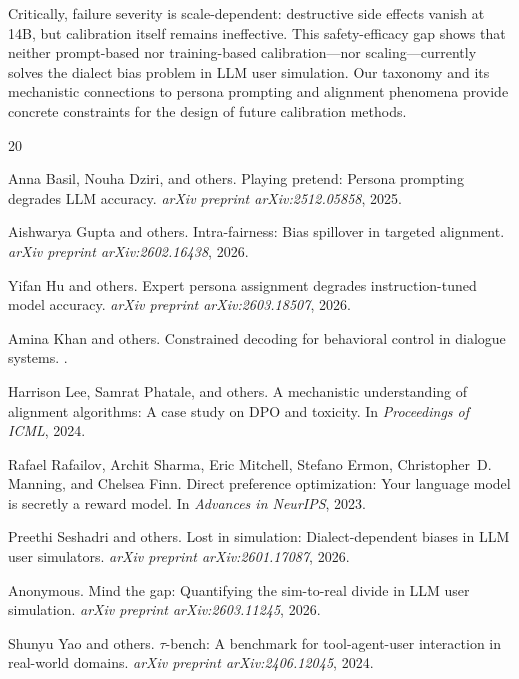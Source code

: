 \documentclass[11pt,a4paper]{article}
\begin{document}
Critically, failure severity is scale-dependent: destructive side effects vanish at 14B, but calibration itself remains ineffective.
This safety-efficacy gap shows that neither prompt-based nor training-based calibration---nor scaling---currently solves the dialect bias problem in LLM user simulation.
Our taxonomy and its mechanistic connections to persona prompting and alignment phenomena provide concrete constraints for the design of future calibration methods.

\begin{thebibliography}{20}

Anna Basil, Nouha Dziri, and others.
\newblock Playing pretend: Persona prompting degrades LLM accuracy.
\newblock \emph{arXiv preprint arXiv:2512.05858}, 2025.

Aishwarya Gupta and others.
\newblock Intra-fairness: Bias spillover in targeted alignment.
\newblock \emph{arXiv preprint arXiv:2602.16438}, 2026.

Yifan Hu and others.
\newblock Expert persona assignment degrades instruction-tuned model accuracy.
\newblock \emph{arXiv preprint arXiv:2603.18507}, 2026.

Amina Khan and others.
\newblock Constrained decoding for behavioral control in dialogue systems.
.

Harrison Lee, Samrat Phatale, and others.
\newblock A mechanistic understanding of alignment algorithms: A case study on DPO and toxicity.
\newblock In \emph{Proceedings of ICML}, 2024.

Rafael Rafailov, Archit Sharma, Eric Mitchell, Stefano Ermon, Christopher~D. Manning, and Chelsea Finn.
\newblock Direct preference optimization: Your language model is secretly a reward model.
\newblock In \emph{Advances in NeurIPS}, 2023.

Preethi Seshadri and others.
\newblock Lost in simulation: Dialect-dependent biases in LLM user simulators.
\newblock \emph{arXiv preprint arXiv:2601.17087}, 2026.

Anonymous.
\newblock Mind the gap: Quantifying the sim-to-real divide in LLM user simulation.
\newblock \emph{arXiv preprint arXiv:2603.11245}, 2026.

Shunyu Yao and others.
\newblock $\tau$-bench: A benchmark for tool-agent-user interaction in real-world domains.
\newblock \emph{arXiv preprint arXiv:2406.12045}, 2024.

\end{thebibliography}
\end{document}
